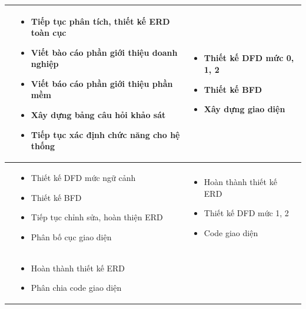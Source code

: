\documentclass[a4paper,12pt]{report}
\begin{document}
\begin{center}
\begin{longtable}{|>{\centering\arraybackslash}c|
        >{\centering\arraybackslash}p{7cm}|
        >{\centering\arraybackslash}p{7cm}|}
        \hline
        3                                                     &
        \begin{itemize}
            \item Tiếp tục phân tích, thiết kế ERD toàn cục
            \item Viết bào cáo phần giới thiệu doanh nghiệp
            \item Viết báo cáo phần giới thiệu phần mềm
            \item Xây dựng bảng câu hỏi khảo sát
            \item Tiếp tục xác định chức năng cho hệ thống
        \end{itemize}
                                                              &
        \begin{itemize}
            \item Thiết kế DFD mức 0, 1, 2
            \item Thiết kế BFD
            \item Xây dựng giao diện
        \end{itemize}                              \\
        \hline
        4                                                     &
        \begin{itemize}
            \item Thiết kế DFD mức ngữ cảnh
            \item Thiết kế BFD
            \item Tiếp tục chỉnh sửa, hoàn thiện ERD
            \item Phân bố cục giao diện
        \end{itemize}
                                                              &
        \begin{itemize}
            \item Hoàn thành thiết kế ERD
            \item Thiết kế DFD mức 1, 2
            \item Code giao diện
        \end{itemize}                               \\
        \hline
        5                                                     &
        \begin{itemize}
            \item Hoàn thành thiết kế ERD
            \item Phân chia code giao diện
        \end{itemize}
                                                              &

\end{longtable}
\end{center}
\end{document}
